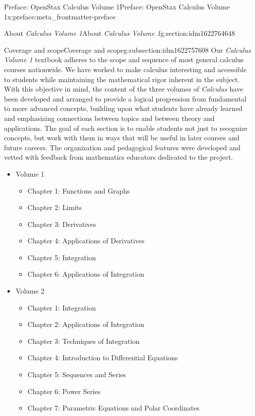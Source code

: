 \documentclass[oneside,10pt,]{book}
\numberwithin{equation}{section}
\begin{document}
\begin{preface}{Preface: OpenStax Calculus Volume 1}{}{Preface: OpenStax Calculus Volume 1}{}{}{x:preface:meta_frontmatter-preface}
\begin{sectionptx}{About \emph{Calculus Volume 1}}{}{About \emph{Calculus Volume 1}}{}{}{g:section:idm1622764648}
\typeout{************************************************}
%
\begin{subsectionptx}{Coverage and scope}{}{Coverage and scope}{}{}{g:subsection:idm1622757608}
Our \emph{Calculus Volume 1} textbook adheres to the scope and sequence of most general calculus courses nationwide. We have worked to make calculus interesting and accessible to students while maintaining the mathematical rigor inherent in the subject. With this objective in mind, the content of the three volumes of \emph{Calculus} have been developed and arranged to provide a logical progression from fundamental to more advanced concepts, building upon what students have already learned and emphasizing connections between topics and between theory and applications. The goal of each section is to enable students not just to recognize concepts, but work with them in ways that will be useful in later courses and future careers. The organization and pedagogical features were developed and vetted with feedback from mathematics educators dedicated to the project.%
%
\begin{itemize}[label=\textbullet]
\item{}Volume 1%
%
\begin{itemize}[label=$\circ$]
\item{}Chapter 1: Functions and Graphs%
\item{}Chapter 2: Limits%
\item{}Chapter 3: Derivatives%
\item{}Chapter 4: Applications of Derivatives%
\item{}Chapter 5: Integration%
\item{}Chapter 6: Applications of Integration%
\end{itemize}
\item{}Volume 2%
%
\begin{itemize}[label=$\circ$]
\item{}Chapter 1: Integration%
\item{}Chapter 2: Applications of Integration%
\item{}Chapter 3: Techniques of Integration%
\item{}Chapter 4: Introduction to Differential Equations%
\item{}Chapter 5: Sequences and Series%
\item{}Chapter 6: Power Series%
\item{}Chapter 7: Parametric Equations and Polar Coordinates%
\end{itemize}

\end{itemize}
\end{subsectionptx}
\end{sectionptx}
\end{preface}
\end{document}
